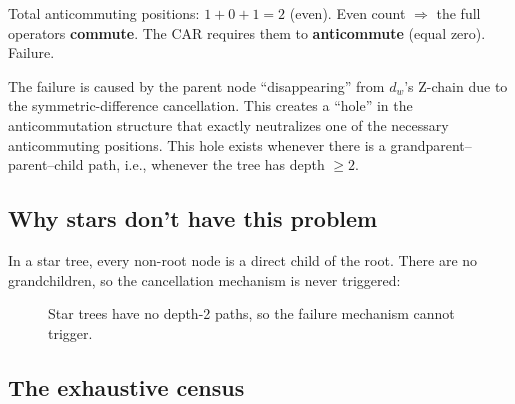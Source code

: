 \documentclass[11pt,a4paper]{article}
\theoremstyle{definition}
\begin{document}
Total anticommuting positions: $1 + 0 + 1 = 2$ (even).  Even count
$\Rightarrow$ the full operators \textbf{commute}.  The CAR requires
them to \textbf{anticommute} (equal zero).  Failure.

\begin{keyinsight}
The failure is caused by the parent node ``disappearing'' from
$d_w$'s Z-chain due to the symmetric-difference cancellation.  This
creates a ``hole'' in the anticommutation structure that exactly
neutralizes one of the necessary anticommuting positions.  This hole
exists whenever there is a grandparent--parent--child path, i.e.,
whenever the tree has depth $\ge 2$.
\end{keyinsight}

\subsection{Why stars don't have this problem}

In a star tree, every non-root node is a direct child of the root.
There are no grandchildren, so the cancellation mechanism is never
triggered:

\begin{figure}[h]
\centering
{}
\caption{Star trees have no depth-2 paths, so the failure mechanism
cannot trigger.}
\label{fig:star-safe}
\end{figure}

\subsection{The exhaustive census}
\end{document}

